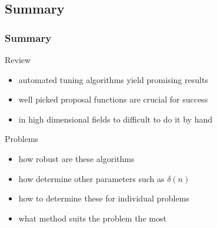 \subsection{Summary}
\begin{frame}
\frametitle{Summary}

\begin{block}{Review}
\begin{itemize}
\item automated tuning algorithms yield promising results
\item well picked proposal functions are crucial for success
\item in high dimensional fields to difficult to do it by hand
\end{itemize}
\end{block}

\begin{block}{Problems}
\begin{itemize}
\item how robust are these algorithms
\item how determine other parameters such as $\delta(n)$
\item how to determine these for individual problems 
\item what method suits the problem the most
\end{itemize}
\end{block}


\end{frame}